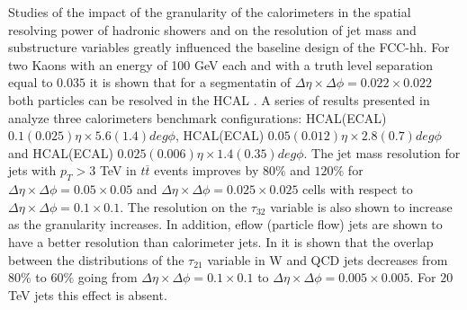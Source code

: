 Studies of the impact of the granularity of the calorimeters in the spatial resolving power of hadronic showers and on the resolution of jet mass and substructure variables greatly influenced the baseline design of the FCC-hh. For two Kaons with an energy of 100 GeV each and with a truth level separation equal to $0.035$ it is shown that for a segmentatin of $\Delta\eta\times\Delta\phi=0.022\times0.022$ both particles can be resolved in the HCAL \cite{FCC_HCALgran_doubleK}. A series of results presented in \cite{BOOST2017,FCCweek2015,FCCweek2016} analyze three calorimeters benchmark configurations: HCAL(ECAL) $0.1(0.025) \eta\times5.6(1.4) deg \phi$, HCAL(ECAL) $0.05(0.012) \eta\times2.8(0.7) deg \phi$ and HCAL(ECAL) $0.025(0.006) \eta \times 1.4(0.35) deg \phi$. The jet mass resolution for jets with $p_T>3$ TeV in $t\overline{t}$ events improves by $80 \%$ and $120 \%$ for $\Delta\eta\times\Delta\phi = 0.05 \times 0.05$ and $\Delta\eta\times\Delta\phi = 0.025 \times 0.025$ cells with respect to $\Delta\eta\times\Delta\phi = 0.1\times0.1$. The resolution on the $\tau_{32}$ variable is also shown to increase as the granularity increases. In addition, eflow (particle flow) jets are shown to have a better resolution than calorimeter jets. In \cite{BOOST2017} it is shown that the overlap between the distributions of the $\tau_{21}$ variable in W and QCD jets decreases from $80\%$ to $60\%$ going from $\Delta\eta\times\Delta\phi = 0.1 \times 0.1$ to $\Delta\eta\times\Delta\phi = 0.005 \times 0.005$. For $20$ TeV jets this effect is absent.



